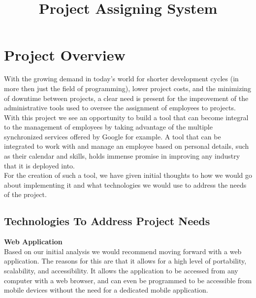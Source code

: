 \documentclass[12pt]{article}
\title{Project Assigning System}
\begin{document}
    \newcommand{\titleimage}{kpmg.png}
    
    
    
	
	\newpage

	\section{Project Overview}
	
	With the growing demand in today's world for shorter development cycles (in more then just the field of programming), lower project costs, and the minimizing of downtime between projects, a clear need is present for the improvement of the administrative tools used to oversee the assignment of employees to projects. With this project we see an opportunity to build a tool that can become integral to the management of employees by taking advantage of the multiple synchronized services offered by Google for example. A tool that can be integrated to work with and manage an employee based on personal details, such as their calendar and skills, holds immense promise in improving any industry that it is deployed into.\\
	
	For the creation of such a tool, we have given initial thoughts to how we would go about implementing it and what technologies we would use to address the needs of the project.
	
	\subsection*{Technologies To Address Project Needs}
	\textbf{Web Application}\\
	Based on our initial analysis we would recommend moving forward with a web application. The reasons for this are that it allows for a high level of portability, scalability, and accessibility. It allows the application to be accessed from any computer with a web browser, and can even be programmed to be accessible from mobile devices without the need for a dedicated mobile application.\\
		
\end{document}
